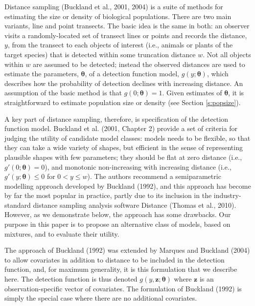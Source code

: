 \documentclass[useAMS,referee]{biom}
\begin{document}
Distance sampling (Buckland et al., 2001, 2004) is a suite of methods for estimating the size or density of biological populations.  There are two main variants, line and point transects. The basic idea is the same in both: an observer visits a randomly-located set of transect lines or points and records the distance, $y$, from the transect to each objects of interest (i.e., animals or plants of the target species) that is detected within some truncation distance $w$.  Not all objects within $w$ are assumed to be detected; instead the observed distances are used to estimate the parameters, $\bm{\theta}$, of a detection function model, $g(y;\bm{\theta})$, which describes how the probability of detection declines with increasing distance.  An assumption of the basic method is that $g(0;\bm{\theta})=1$. Given estimates of $\bm{\theta}$, it is straightforward to estimate population size or density (see Section \ref{s:popsize}).

A key part of distance sampling, therefore, is specification of the detection function model.  Buckland et al. (2001, Chapter 2) provide a set of criteria for judging the utility of candidate model classes: models needs to be flexible, so that they can take a wide variety of shapes, but efficient in the sense of representing plausible shapes with few parameters; they should be flat at zero distance (i.e., $g'(0;\bm{\theta})=0$), and monotonic non-increasing with increasing distance (i.e., $g'(y;\bm{\theta}) \leq 0$ for $0<y\leq w$).  The authors recommend a semiparametric modelling approach developed by Buckland (1992), and this approach has become by far the most popular in practice, partly due to its inclusion in the industry-standard distance sampling analysis software Distance (Thomas et al., 2010).  However, as we demonstrate below, the approach has some drawbacks.  Our purpose in this paper is to propose an alternative class of models, based on mixtures, and to evaluate their utility.

The approach of Buckland (1992) was extended by Marques and Buckland (2004) to allow covariates in addition to distance to be included in the detection function, and, for maximum generality, it is this formulation that we describe here.  The detection function is thus denoted $g(y, \mathbf{z};\bm{\theta})$ where $\mathbf{z}$ is an observation-specific vector of covariates.  The formulation of Buckland (1992) is simply the special case where there are no additional covariates.
\end{document}
